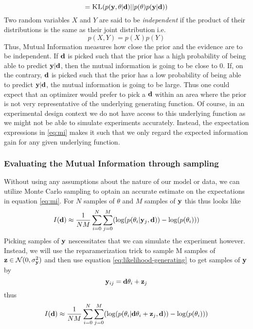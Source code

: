 $$ = \textsc{KL}(p(\mathbf{y}, \theta | \mathbf{d})|| p(\theta)p(\mathbf{y}|\mathbf{d}))$$
Two random variables $X$ and $Y$ are said to be \textit{independent} if the product of their distributions is the same as their joint distribution i.e.
\begin{equation}p(X,Y) = p(X)p(Y)\end{equation}
Thus, Mutual Information measures how close the prior and the evidence are to be independent. 
If $\mathbf{d}$ is picked such that the prior has a high probability of being able to predict $\mathbf{y}|\mathbf{d}$, then the mutual information is going to be close to 0. 
If, on the contrary, $\mathbf{d}$ is picked such that the prior has a low probability of being able to predict $\mathbf{y}|\mathbf{d}$, the mutual information is going to be large.
Thus one could expect that an optimizer would prefer to pick a $\mathbf{d}$ within an area where the prior is not very representative of the underlying generating function.
Of course, in an experimental design context we do not have access to this underlying function as we might not be able to simulate experiments accurately. Instead, the expectation expressions in \ref{eq:mi}
makes it such that we only regard the expected information gain for any given underlying function.

\subsubsection{Evaluating the Mutual Information through sampling}
Without using any assumptions about the nature of our model or data, we can utilize Monte Carlo sampling to optain an accurate estimate on the expectations in equation \ref{eq:mi}.
For $N$ samples of $\theta$ and $M$ samples of $\mathbf{y}$ this thus looks like
\begin{equation}
  I(\mathbf{d}) \approx \frac{1}{NM}\sum_{i=0}^N\sum_{j=0}^M(\log (p(\theta_i | \mathbf{y}_j, \mathbf{d})) - \log(p(\theta_i)))
\end{equation}
Picking samples of $\mathbf{y}$ nescessitates that we can simulate the experiment however.
Instead, we will use the reparamerization trick to sample M samples of $\mathbf{z}\in \mathcal{N}(0, \sigma^2_{\mathbf{y}})$
and then use equation \ref{eq:likelihood-generating} to get samples of $\mathbf{y}$ by
\begin{equation}
  \mathbf{y}_{ij} = \mathbf{d}\theta_i + \mathbf{z}_j
\end{equation}
thus 
\begin{equation}
  I(\mathbf{d}) \approx \frac{1}{NM}\sum_{i=0}^N\sum_{j=0}^M(\log (p(\theta_i | \mathbf{d} \theta_i + \mathbf{z}_j, \mathbf{d})) - \log(p(\theta_i)))
\end{equation}

